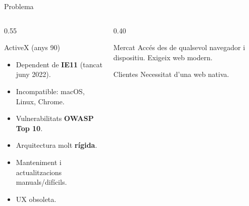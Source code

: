 \begin{frame}{Problema}
  \begin{columns}[T]
    \begin{column}{0.55\textwidth}
      \begin{alertblock}{ActiveX (anys 90)}
        \begin{itemize}
          \item Dependent de \textbf{IE11} (tancat juny 2022).
          \item Incompatible: macOS, Linux, Chrome.
          \item Vulnerabilitats \textbf{OWASP Top 10}.
        \end{itemize}
      \end{alertblock}

      \vspace{0.5em}
      \begin{itemize}
        \item Arquitectura molt \textbf{rígida}.
        \item Manteniment i actualitzacions manuals/difícils. 
        \item UX obsoleta.
      \end{itemize}
    \end{column}

    \begin{column}{0.40\textwidth}
      \begin{block}{Mercat}
        \small Accés des de qualsevol navegador i dispositiu. Exigeix web modern.
      \end{block}

      \vspace{0.8em}
      \begin{block}{Clientes}
        \small Necessitat d'una web nativa.
      \end{block}
    \end{column}
  \end{columns}
\end{frame}

